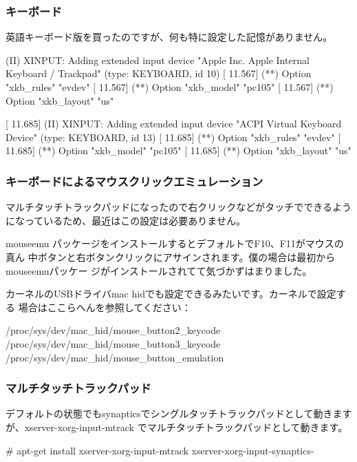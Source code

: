 \documentclass[mingoth,a4paper]{jsarticle}
\begin{document}
\subsubsection{キーボード}

英語キーボード版を買ったのですが、何も特に設定した記憶がありません。

\begin{commandline}
[    11.567] (II) XINPUT: Adding extended input device "Apple Inc. Apple Internal Keyboard / Trackpad" (type: KEYBOARD, id 10)
[    11.567] (**) Option "xkb_rules" "evdev"
[    11.567] (**) Option "xkb_model" "pc105"
[    11.567] (**) Option "xkb_layout" "us"

[    11.685] (II) XINPUT: Adding extended input device "ACPI Virtual Keyboard Device" (type: KEYBOARD, id 13)
[    11.685] (**) Option "xkb_rules" "evdev"
[    11.685] (**) Option "xkb_model" "pc105"
[    11.685] (**) Option "xkb_layout" "us"
\end{commandline}

\subsubsection{キーボードによるマウスクリックエミュレーション}

マルチタッチトラックパッドになったので右クリックなどがタッチでできるよう
になっているため、最近はこの設定は必要ありません。

mouseemu パッケージをインストールするとデフォルトでF10、F11がマウスの真ん
中ボタンと右ボタンクリックにアサインされます。僕の場合は最初からmouseemuパッケー
ジがインストールされてて気づかずはまりました。

カーネルのUSBドライバmac hidでも設定できるみたいです。カーネルで設定する
場合はここらへんを参照してください：
\begin{commandline}
/proc/sys/dev/mac_hid/mouse_button2_keycode
/proc/sys/dev/mac_hid/mouse_button3_keycode  
/proc/sys/dev/mac_hid/mouse_button_emulation
\end{commandline}

\subsubsection{マルチタッチトラックパッド}

デフォルトの状態でもsynapticsでシングルタッチトラックパッドとして動きますが、xserver-xorg-input-mtrack でマルチタッチトラックパッドとして動きます。 

 \begin{commandline}
# apt-get install xserver-xorg-input-mtrack xserver-xorg-input-synaptics-
 \end{commandline}
\end{document}
